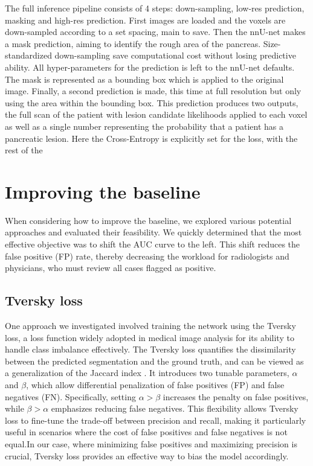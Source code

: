 \documentclass[conference]{IEEEtran}
\begin{document}
The full inference pipeline consists of 4 steps: down-sampling, low-res prediction, masking and high-res prediction. First images are loaded and the voxels are down-sampled according to a set spacing, main to save. Then the nnU-net makes a mask prediction, aiming to identify the rough area of the pancreas. Size-standardized down-sampling save computational cost without losing predictive ability. All hyper-parameters for the prediction is left to the nnU-net defaults. The mask is represented as a bounding box which is applied to the original image. Finally, a second prediction is made, this time at full resolution but only using the area within the bounding box. This prediction produces two outputs, the full scan of the patient with lesion candidate likelihoods applied to each voxel as well as a single number representing the probability that a patient has a pancreatic lesion. Here the Cross-Entropy is explicitly set for the loss, with the rest of the 


\section{Improving the baseline}

When considering how to improve the baseline, we explored various potential approaches and evaluated their feasibility. We quickly determined that the most effective objective was to shift the AUC curve to the left. This shift reduces the false positive (FP) rate, thereby decreasing the workload for radiologists and physicians, who must review all cases flagged as positive.

\subsection{Tversky loss}
One approach we investigated involved training the network using the Tversky loss, a loss function widely adopted in medical image analysis for its ability to handle class imbalance effectively. The Tversky loss quantifies the dissimilarity between the predicted segmentation and the ground truth, and can be viewed as a generalization of the Jaccard index \cite{b3}. It introduces two tunable parameters, $\alpha$ and $\beta$, which allow differential penalization of false positives (FP) and false negatives (FN). Specifically, setting $\alpha > \beta$ increases the penalty on false positives, while $\beta > \alpha$ emphasizes reducing false negatives. This flexibility allows Tversky loss to fine-tune the trade-off between precision and recall, making it particularly useful in scenarios where the cost of false positives and false negatives is not equal.In our case, where minimizing false positives and maximizing precision is crucial, Tversky loss provides an effective way to bias the model accordingly.
\end{document}
